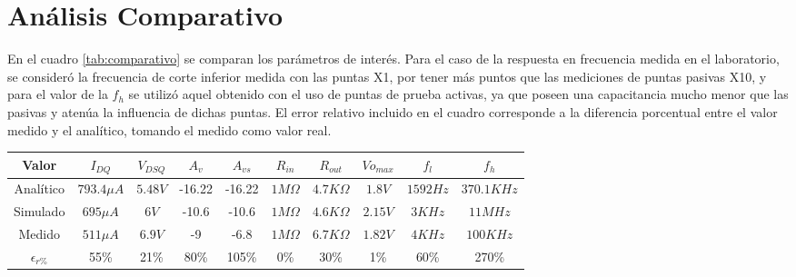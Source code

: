 \documentclass[a4paper, 10pt, spanish]{article}
\begin{document}
\section{Análisis Comparativo}
En el cuadro \ref{tab:comparativo} se comparan los parámetros de interés. Para el caso de la respuesta en frecuencia medida en el laboratorio, se consideró la frecuencia de corte inferior medida con las puntas X1, por tener más puntos que las mediciones de puntas pasivas X10, y para el valor de la $f_h$ se utilizó aquel obtenido con el uso de puntas de prueba activas, ya que poseen una capacitancia mucho menor que las pasivas y atenúa la influencia de dichas puntas. El error relativo incluido en el cuadro corresponde a la diferencia porcentual entre el valor medido y el analítico, tomando el medido como valor real.

\begin{center}
  \begin{tabular}{|c|c|c|c|c|c|c|c|c|c|}
    \hline
    Valor & $I_{DQ}$ & $V_{DSQ}$ & $A_v$ & $A_{vs}$ & $R_{in}$ & $R_{out}$ & $V{o_{max}}$ & $f_l$ & $f_h$ \\
    \hline
    Analítico & $793.4\mu A$& $5.48V$& -16.22 & -16.22 & $1M\Omega$ & $4.7K\Omega$ & $1.8V$ & $1592Hz$ & $370.1KHz$ \\
    \hline
    Simulado & $695\mu A$ & $6V$ & -10.6 & -10.6 & $1M\Omega$ & $4.6K\Omega$ & $2.15V$ & $3KHz$ & $11MHz$ \\
    \hline
    Medido & $511\mu A$ & $6.9V$ & -9 & -6.8 & $1M\Omega$ & $6.7K\Omega$ & $1.82V$ & $4KHz$ & $100KHz$ \\
    \hline
    \hline
    $\epsilon_{r\%}$ & 55\% & 21\% & 80\% & 105\% & 0\% & 30\% & 1\% & 60\% & 270\% \\
    \hline
  \end{tabular}
  \label{tab:comparativo}
\end{center}


\end{document}
